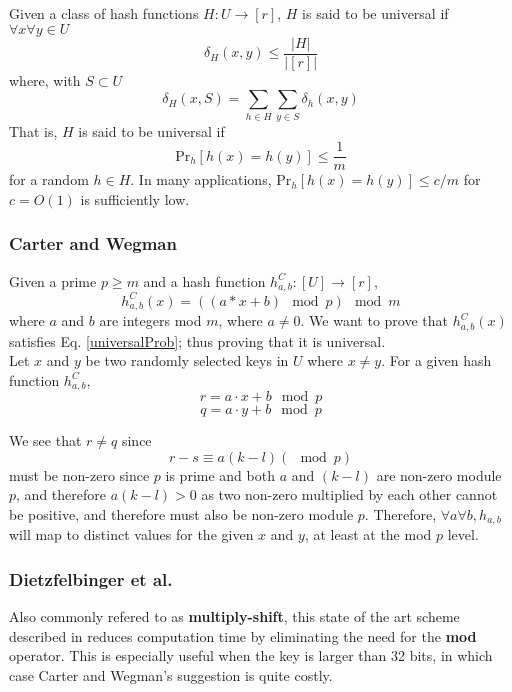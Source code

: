 \documentclass[../../main.tex]{subfiles}
\begin{document}
Given a class of hash functions $H:U\rightarrow [r]$, $H$ is said to be universal if $\forall x \forall y \in U$
$$
	\delta_H (x,y) \leq \frac{|H|}{|[r]|}
$$
where, with $S\subset U$
$$
\delta_H (x,S) = \sum_{h\in H}\sum_{y\in S} \delta_h(x,y)
$$
That is, $H$ is said to be universal if 
\begin{equation}\label{universalProb}
\mathrm{Pr}_h[h(x)=h(y)]\leq \frac{1}{m}
\end{equation}
for a random $h \in H$.
In many applications, Pr$_h[h(x)=h(y)]\leq c/m$ for $c=O(1)$ is sufficiently low.

\subsubsection{Carter and Wegman\cite{carterWegman}}
Given a prime $p\geq m$ and a hash function $h_{a,b}^C:[U]\rightarrow [r]$,
\begin{equation}\label{carterhash}
h_{a,b}^{C}(x)=((a*x + b) \mod p) \mod m
\end{equation}
where $a$ and $b$ are integers mod $m$, where $a\neq 0$. We want to prove that $h_{a,b}^{C}(x)$ satisfies Eq. \ref{universalProb}; thus proving that it is universal.\\

\noindent Let $x$ and $y$ be two randomly selected keys in $U$ where $x\neq y$. For a given hash function $h_{a,b}^{C}$,
$$
r = a\cdot x + b \mod p
$$
$$
q = a \cdot y + b \mod p
$$

\noindent We see that $r\neq q$ since 
$$
r - s \equiv a(k-l) ( \mod p)
$$
must be non-zero since $p$ is prime and both $a$ and $(k-l)$ are non-zero module $p$, and therefore $a(k-l) > 0$ as two non-zero multiplied by each other cannot be positive, and therefore must also be non-zero module $p$.
Therefore, $\forall a\forall b, h_{a,b}$ will map to distinct values for the given $x$ and $y$, at least at the mod $p$ level.

\subsubsection*{Dietzfelbinger et al.\cite{Dietzfelbinger}}
Also commonly refered to as \textbf{multiply-shift}, this state of the art scheme described in \cite{Dietzfelbinger} reduces computation time by eliminating the need for the \textbf{mod} operator. This is especially useful when the key is larger than 32 bits, in which case Carter and Wegman's suggestion is quite costly\cite{dikuHash}.\\
\end{document}

